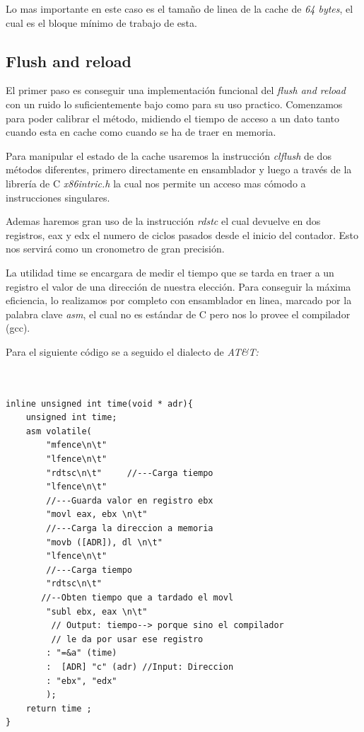 \documentclass[paper=a4, fontsize=11pt]{scrartcl} %
\begin{document}
Lo mas importante en este caso es el tamaño de linea de la cache de \textit{64 bytes}, el cual es el bloque mínimo de trabajo de esta. 

\subsection{Flush and reload}

 El primer paso es conseguir una implementación funcional del \textit{flush and reload} con un ruido lo suficientemente bajo como para su uso practico.
Comenzamos para poder calibrar el método, midiendo el tiempo de acceso a un dato tanto cuando esta en cache como cuando se ha de traer en memoria.

Para manipular el estado de la cache usaremos la instrucción \textit{clflush} de dos métodos diferentes, primero directamente en ensamblador y luego a través de la librería de C \textit{x86intric.h} la cual nos permite un acceso mas cómodo a instrucciones singulares.


Ademas haremos gran uso de la instrucción \textit{rdstc} el cual devuelve en dos registros, eax y edx el numero de ciclos pasados desde el inicio del contador. Esto nos servirá como un cronometro de gran precisión.


La utilidad time se encargara de medir el tiempo que se tarda en traer a un registro el valor de una dirección de nuestra elección. Para conseguir la máxima eficiencia, lo realizamos por completo con ensamblador en linea, marcado por la palabra clave \textit{asm}, el cual no es estándar de C pero nos lo provee el compilador (gcc).

Para el siguiente código se a seguido el dialecto de \textit{AT\&T:}



\begin{lstlisting}[frame=single, style=myCustomStyle]


inline unsigned int time(void * adr){
    unsigned int time;
    asm volatile(
        "mfence\n\t"
        "lfence\n\t"
        "rdtsc\n\t"     //---Carga tiempo
        "lfence\n\t"
        //---Guarda valor en registro ebx
        "movl eax, ebx \n\t"  
        //---Carga la direccion a memoria
        "movb ([ADR]), dl \n\t" 
        "lfence\n\t"
        //---Carga tiempo
        "rdtsc\n\t" 
       //--Obten tiempo que a tardado el movl
        "subl ebx, eax \n\t" 
         // Output: tiempo--> porque sino el compilador
         // le da por usar ese registro
        : "=&a" (time)  
        :  [ADR] "c" (adr) //Input: Direccion
        : "ebx", "edx"
        );
    return time ;
}
\end{lstlisting}
\end{document}
